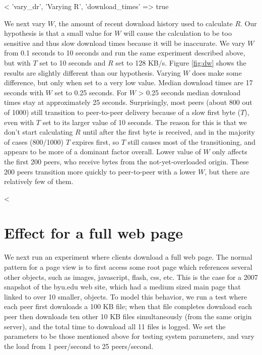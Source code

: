 <%
  'vary_dr', 'Varying R', 'download_times' => true %

We next vary $W$, the amount of recent download history used to calculate $R$. Our hypothesis is that 
a small value for $W$ will cause the calculation to be too sensitive and thus slow download times because it will be inaccurate. 
We vary $W$ from 0.1 seconds 
to 10 seconds and run the same experiment described above, but with $T$ set to 10 seconds and $R$ set to 128 KB/s. Figure \ref{fig:dw} shows the results are 
slightly different than our hypothesis. Varying $W$ does make some difference, but only when set 
to a very low value. Median download times are 17 seconds with $W$ set to 0.25 seconds. For $W$ \textgreater{} 0.25 seconds
median download times stay at approximately 25 seconds. Surprisingly, 
most peers (about 800 out of 1000) still transition to peer-to-peer delivery because of 
a slow first byte ($T$), even with $T$ set to its larger value of 10 seconds. 
The reason for this is that we don't start calculating $R$ until after the first byte is received, and 
in the majority of cases (800/1000) $T$ expires first, so $T$ still 
causes most of the transitioning, and appears to be more of a dominant factor overall.  Lower value of $W$ only affects the first 
200 peers, who receive bytes from the not-yet-overloaded origin.  
These 200 peers transition more quickly to peer-to-peer with a lower $W$, but there are relatively few of them.



<%

\section{Effect for a full web page}

We next run an experiment where clients download a full web page.  The normal pattern for a page view 
is to first access some root page which references several other objects, such as images, 
javascript, flash, css, etc. This is the case for a 2007 snapshot of the byu.edu web site, which had a medium sized main page that 
linked to over 10 smaller, objects.  To model this behavior, we run a test where each peer first 
downloads a 100 KB file; when that file completes download each peer then downloads ten other 10 KB files simultaneously 
(from the same origin server), and the total time to download all 11 files is logged. We set the parameters 
to be those mentioned above for testing system parameters, and vary the load from 1 peer/second to 25 peers/second. 

